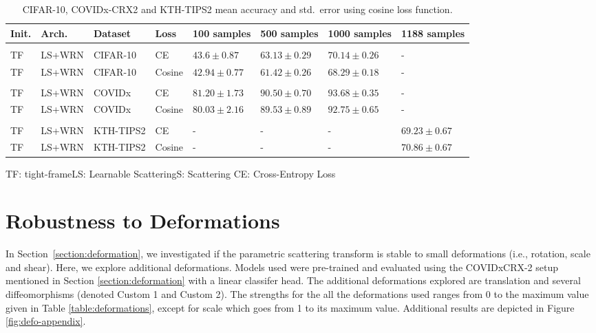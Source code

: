 \documentclass[10pt,twocolumn,letterpaper]{article}
\begin{document}
\begin{table}[H] 
    \centering
    \caption{  CIFAR-10, COVIDx-CRX2 and KTH-TIPS2 mean accuracy and std.\ error using cosine loss function.} 
    \label{table:cifarresult_cosineloss}
    \small
    \fontsize{8.5}{8.5}\selectfont 
    \begin{tabularx}{400pt}{llllllll}  
        \hline
        Init. &Arch.& Dataset & Loss & 100 samples & 500 samples & 1000 samples & 1188 samples\\
        \hline
        \\[-2mm]
        TF&LS+WRN&CIFAR-10 & CE&$\mathbf{43.6}\pm0.87$ & $\mathbf{63.13}\pm0.29$&$\mathbf{70.14}\pm0.26$& -\\ 
        TF &LS+WRN& CIFAR-10 & Cosine &$42.94 \pm 0.77$ & $61.42 \pm 0.26$ & $68.29 \pm 0.18$& -\\ \hline
        \\[-2mm]
        TF &LS+WRN& COVIDx &CE &$\mathbf{81.20}\pm1.73$&$\mathbf{90.50}\pm0.70$ & $\mathbf{93.68}\pm0.35$& -\\
        TF &LS+WRN& COVIDx & Cosine &$80.03\pm2.16 $ & $89.53\pm0.89 $ & $92.75\pm0.65$& -\\
        \hline
        \\[-2mm]
        TF &LS+WRN & KTH-TIPS2 & CE &  -&-&-&$ 69.23\pm0.67 $ \\
        TF &LS+WRN & KTH-TIPS2 & Cosine &  -&-&-&$\mathbf{70.86}\pm0.67 $ \\
        \hline
    \end{tabularx}
\begin{flushleft}
\scriptsize
\vspace{-5pt}
\hspace{45pt} TF: tight-frame\hspace{5pt}LS: Learnable Scattering\hspace{5pt}S: Scattering\hspace{5pt} CE: Cross-Entropy Loss \hspace{20pt} \\
\end{flushleft}
\vspace{-18pt}
\end{table}

\section{Robustness to Deformations}

\label{appendix:deformations}
In Section~\ref{section:deformation}, we investigated if the parametric scattering transform is stable to small deformations (i.e., rotation, scale and shear). Here, we explore additional deformations. Models used were pre-trained and evaluated using the COVIDxCRX-2 setup mentioned in Section \ref{section:deformation} with a linear classifer head. The additional deformations explored are translation and several diffeomorphisms (denoted Custom 1 and Custom 2). The strengths for the all the deformations used ranges from 0 to the maximum value given in Table \ref{table:deformations}, except for scale which goes from 1 to its maximum value. Additional results are depicted in Figure \ref{fig:defo-appendix}.
\end{document}
